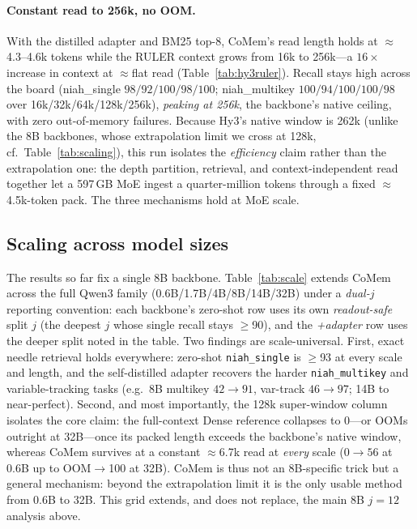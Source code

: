 

\paragraph{Constant read to 256k, no OOM.} With the distilled adapter and BM25
top-8, CoMem's read length holds at $\approx$4.3--4.6k tokens while the RULER
context grows from 16k to 256k---a $16\times$ increase in context at
$\approx$flat read (Table~\ref{tab:hy3ruler}). Recall stays high across the
board (niah\_single $98/92/100/98/100$; niah\_multikey $100/94/100/100/98$ over
16k/32k/64k/128k/256k), \emph{peaking at 256k}, the backbone's native ceiling,
with zero out-of-memory failures. Because Hy3's native window is 262k (unlike
the 8B backbones, whose extrapolation limit we cross at 128k, cf.\
Table~\ref{tab:scaling}), this run isolates the \emph{efficiency} claim rather
than the extrapolation one: the depth partition, retrieval, and
context-independent read together let a 597\,GB MoE ingest a quarter-million
tokens through a fixed $\approx$4.5k-token pack. The three mechanisms hold at
MoE scale.



\subsection{Scaling across model sizes}
\label{sec:scaling-models}
The results so far fix a single 8B backbone. Table~\ref{tab:scale} extends CoMem
across the full Qwen3 family (0.6B/1.7B/4B/8B/14B/32B) under a
\emph{dual-$j$} reporting convention: each backbone's zero-shot row uses its own
\emph{readout-safe} split $j$ (the deepest $j$ whose single recall stays $\ge$90),
and the \emph{+adapter} row uses the deeper split noted in the table. Two
findings are scale-universal. First, exact needle retrieval holds everywhere:
zero-shot \texttt{niah\_single} is $\ge$93 at every scale and length, and the
self-distilled adapter recovers the harder \texttt{niah\_multikey} and
variable-tracking tasks (e.g.\ 8B multikey $42{\to}91$, var-track $46{\to}97$;
14B to near-perfect). Second, and most importantly, the 128k super-window column
isolates the core claim: the full-context Dense reference collapses to 0---or
OOMs outright at 32B---once its packed length exceeds the backbone's native
window, whereas CoMem survives at a constant $\approx$6.7k read at
\emph{every} scale ($0{\to}56$ at 0.6B up to OOM$\to$100 at 32B). CoMem is thus
not an 8B-specific trick but a general mechanism: beyond the extrapolation limit
it is the only usable method from 0.6B to 32B. This grid extends, and does not
replace, the main 8B $j{=}12$ analysis above.

